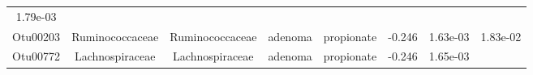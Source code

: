 \documentclass[11pt,]{article}
\begin{document}
\begin{longtable}[]{@{}cccccccc@{}}
\begin{minipage}[t]{0.08\columnwidth}
1.79e-03\strut
\end{minipage}\tabularnewline
\begin{minipage}[t]{0.08\columnwidth}\centering\strut
Otu00203\strut
\end{minipage} & \begin{minipage}[t]{0.15\columnwidth}\centering\strut
Ruminococcaceae\strut
\end{minipage} & \begin{minipage}[t]{0.15\columnwidth}\centering\strut
Ruminococcaceae\strut
\end{minipage} & \begin{minipage}[t]{0.08\columnwidth}\centering\strut
adenoma\strut
\end{minipage} & \begin{minipage}[t]{0.09\columnwidth}\centering\strut
propionate\strut
\end{minipage} & \begin{minipage}[t]{0.07\columnwidth}\centering\strut
-0.246\strut
\end{minipage} & \begin{minipage}[t]{0.08\columnwidth}\centering\strut
1.63e-03\strut
\end{minipage} & \begin{minipage}[t]{0.08\columnwidth}\centering\strut
1.83e-02\strut
\end{minipage}\tabularnewline
\begin{minipage}[t]{0.08\columnwidth}\centering\strut
Otu00772\strut
\end{minipage} & \begin{minipage}[t]{0.15\columnwidth}\centering\strut
Lachnospiraceae\strut
\end{minipage} & \begin{minipage}[t]{0.15\columnwidth}\centering\strut
Lachnospiraceae\strut
\end{minipage} & \begin{minipage}[t]{0.08\columnwidth}\centering\strut
adenoma\strut
\end{minipage} & \begin{minipage}[t]{0.09\columnwidth}\centering\strut
propionate\strut
\end{minipage} & \begin{minipage}[t]{0.07\columnwidth}\centering\strut
-0.246\strut
\end{minipage} & \begin{minipage}[t]{0.08\columnwidth}\centering\strut
1.65e-03\strut
\end{minipage} & \begin{minipage}[t]{0.08\columnwidth}\centering\strut

\end{minipage}
\end{longtable}
\end{document}
